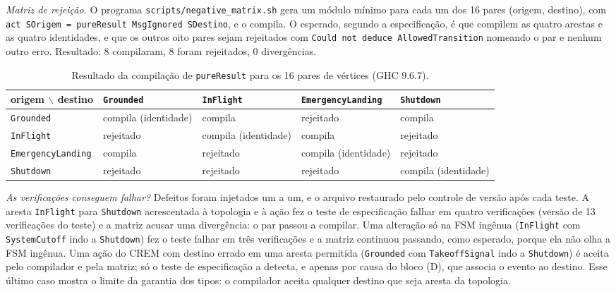 \documentclass[12pt,a4paper]{article}
\begin{document}
\textit{Matriz de rejeição.} O programa \texttt{scripts/negative\_matrix.sh} gera um módulo mínimo para cada um dos 16 pares (origem, destino), com \texttt{act SOrigem = pureResult MsgIgnored SDestino}, e o compila. O esperado, segundo a especificação, é que compilem as quatro arestas e as quatro identidades, e que os outros oito pares sejam rejeitados com \texttt{Could not deduce AllowedTransition} nomeando o par e nenhum outro erro. Resultado: 8 compilaram, 8 foram rejeitados, 0 divergências.

\begin{table}[h]
\centering
\scriptsize
\begin{tabular}{|p{3.0cm}|p{2.5cm}|p{2.3cm}|p{3.0cm}|p{2.5cm}|}
\hline
origem $\backslash$ destino & \texttt{Grounded} & \texttt{InFlight} & \texttt{EmergencyLanding} & \texttt{Shutdown} \\
\hline
\texttt{Grounded} & compila (identidade) & compila & rejeitado & compila \\
\hline
\texttt{InFlight} & rejeitado & compila (identidade) & compila & rejeitado \\
\hline
\texttt{EmergencyLanding} & compila & rejeitado & compila (identidade) & rejeitado \\
\hline
\texttt{Shutdown} & rejeitado & rejeitado & rejeitado & compila (identidade) \\
\hline
\end{tabular}
\caption{Resultado da compilação de \texttt{pureResult} para os 16 pares de vértices (GHC 9.6.7).}
\end{table}

\textit{As verificações conseguem falhar?} Defeitos foram injetados um a um, e o arquivo restaurado pelo controle de versão após cada teste. A aresta \texttt{InFlight} para \texttt{Shutdown} acrescentada à topologia e à ação fez o teste de especificação falhar em quatro verificações (versão de 13 verificações do teste) e a matriz acusar uma divergência: o par passou a compilar. Uma alteração só na FSM ingênua (\texttt{InFlight} com \texttt{SystemCutoff} indo a \texttt{Shutdown}) fez o teste falhar em três verificações e a matriz continuou passando, como esperado, porque ela não olha a FSM ingênua. Uma ação do CREM com destino errado em uma aresta permitida (\texttt{Grounded} com \texttt{TakeoffSignal} indo a \texttt{Shutdown}) é aceita pelo compilador e pela matriz; só o teste de especificação a detecta, e apenas por causa do bloco (D), que associa o evento ao destino. Esse último caso mostra o limite da garantia dos tipos: o compilador aceita qualquer destino que seja aresta da topologia.
\end{document}
